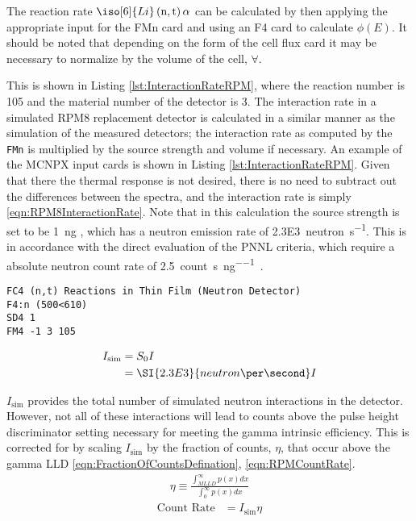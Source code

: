 The reaction rate $\iso[6]{Li}\left(\text{n},\text{t}\right)\alpha$ can be calculated by then applying the appropriate input for the FMn card and using an F4 card to calculate $\phi(E)$.
It should be noted that depending on the form of the cell flux card it may be necessary to normalize by the volume of the cell, $\forall$.

This is shown in Listing \ref{lst:InteractionRateRPM}, where the reaction number is 105 and the material number of the detector is 3.
The interaction rate in a simulated RPM8 replacement detector is calculated in a similar manner as the simulation of the measured detectors; the interaction rate as computed by the \verb+FMn+ is multiplied by the source strength and volume if necessary.
An example of the MCNPX input cards is shown in Listing \ref{lst:InteractionRateRPM}.
Given that there the thermal response is not desired, there is no need to subtract out the differences between the spectra, and the interaction rate is simply \eqref{eqn:RPM8InteractionRate}.
Note that in this calculation the source strength is set to be \SI{1}{\nano\gram} , which has a neutron emission rate of \SI{2.3E3}{neutron\per\second}.
This is in accordance with the direct evaluation of the PNNL criteria, which require a absolute neutron count rate of \SI{2.5}{count\per\second\per\nano\gram{}}.
\begin{lstlisting}[caption={[RPM8 ${}^{6}\text{Li}\left(\text{n},\text{t}\right)\alpha$ Reaction Rate]RPM8 ${}^{6}\text{Li}\left(\text{n},\text{t}\right)\alpha$ Reaction Rate. The detector is all of the layers of cell 500 inside universe 610. This tally is multiplied by an SD card to normalize by the volume},label={lst:InteractionRateRPM}]
FC4 (n,t) Reactions in Thin Film (Neutron Detector)
F4:n (500<610)
SD4 1
FM4 -1 3 105
\end{lstlisting}
\begin{align}
  \label{eqn:RPM8InteractionRate}
  I_{\text{sim}} &= S_0 I \\
  &= \SI{2.3E3}{neutron\per\second} I
\end{align}

$I_{\text{sim}}$ provides the total number of simulated neutron interactions in the detector.
However, not all of these interactions will lead to counts above the pulse height discriminator setting necessary for meeting the gamma intrinsic efficiency.
This is corrected for by scaling $I_{\text{sim}}$ by the fraction of counts, $\eta$, that occur above the gamma LLD \eqref{eqn:FractionOfCountsDefination}, \eqref{eqn:RPMCountRate}.
\begin{align}
  \label{eqn:FractionOfCountsDefination}
  \eta \equiv \frac{\int_{MLLD}^\infty p(x)dx}{\int_0^\infty p(x)dx}
\end{align}
\begin{align}
 \label{eqn:RPMCountRate}
 \text{Count Rate} &= I_{\text{sim}} \eta
\end{align}


